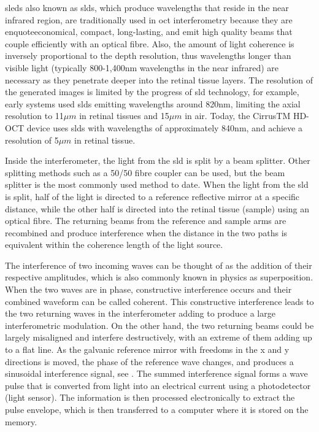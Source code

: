 \Gls{sled}s also known as \Gls{sld}s, which produce wavelengths that reside in the near infrared region,
are traditionally used in \Gls{oct} interferometry because they are enquote{economical,
compact, long-lasting, and emit high quality beams that couple efficiently
with an optical fibre}.\cite{mbib_6} Also, the amount of light coherence
is inversely proportional to the depth resolution, thus wavelengths longer
than visible light (typically 800-1,400nm wavelengths in the near infrared) 
are necessary as they penetrate deeper into the retinal tissue layers.\cite{mbib_4,mbib_7}
The resolution of the generated images is limited by the progress of \Gls{sld}
technology, for example, early systems used \Gls{sld}s emitting wavelengths around
820nm, limiting the axial resolution to 11$\mu m$ in retinal tissues and 15$\mu m$
in air. \cite{mbib_6}  Today, the CirrusTM HD-OCT device uses \Gls{sld}s with wavelengths
of approximately 840nm, and achieve a resolution of 5$\mu m$ in retinal tissue.\cite{mbib_7}

Inside the interferometer, the light from the \Gls{sld} is split by a beam splitter.
Other splitting methods such as a 50/50 fibre coupler can be used, but the beam
splitter is the most commonly used method to date.  When the light from the \Gls{sld}
is split, half of the light is directed to a reference reflective mirror at a
specific distance, while the other half is directed into the retinal tissue (sample)
using an optical fibre.  The returning beams from the reference and sample arms
are recombined and produce interference when the distance in the two paths is
equivalent within the coherence length of the light source. \cite{mbib_5,mbib_6}

The interference of two incoming waves can be thought of as the addition of their
respective amplitudes, which is also commonly known in physics as superposition.
When the two waves are in phase, constructive interference occurs and their combined
waveform can be called coherent.  This constructive interference leads to the two
returning waves in the interferometer adding to produce a large interferometric
modulation.  On the other hand, the two returning beams could be largely misaligned
and interfere destructively, with an extreme of them adding up to a flat line.
As the galvanic reference mirror with freedoms in the x and y directions is moved,
the phase of the reference wave changes, and produces a sinusoidal interference
signal, see . The summed interference signal forms a wave pulse 
that is converted
from light into an electrical current using a photodetector (light sensor).\cite{mbib_6}
The information is then processed electronically to extract the pulse envelope, which
is then transferred to a computer where it is stored on the memory.\cite{mbib_6}

